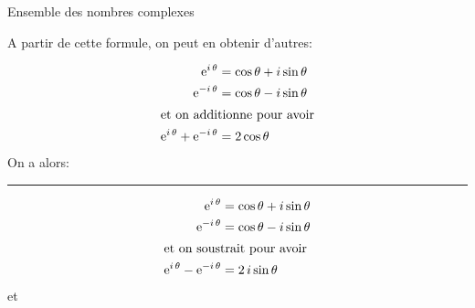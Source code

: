 \begin{chapter}{Ensemble des nombres complexes}
\begin{thm}
A partir de cette formule, on peut en obtenir d'autres: \\
\begin{minipage}{0.45 \actualtextwidth}
\begin{align*}
\mathrm{e}^{i \, \theta }   & = \cos \theta + i \sin \theta \\
\mathrm{e}^{- i \, \theta } & = \cos \theta - i \sin \theta \\
\intertext{et on additionne pour avoir}
\mathrm{e}^{i \, \theta } + \mathrm{e}^{ -i \, \theta } & = 2 \cos \theta \\
\end{align*}
On a alors: \\
\end{minipage}
\begin{minipage}[c][][c]{.02\actualtextwidth}
      \rule{.4pt}{10\baselineskip}
\end{minipage}
\begin{minipage}{0.45 \actualtextwidth}
\begin{align*}
\mathrm{e}^{i \, \theta }   & = \cos \theta + i \sin \theta \\
\mathrm{e}^{- i \, \theta } & = \cos \theta - i \sin \theta \\
\intertext{et on soustrait pour avoir}
\mathrm{e}^{i \, \theta } - \mathrm{e}^{ -i \, \theta } & = 2 \, i \sin \theta \\
\end{align*}
et \\
\end{minipage}
\end{thm}


\end{chapter}
